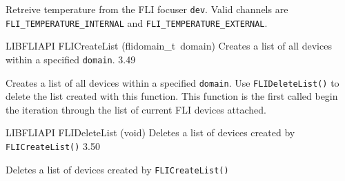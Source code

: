 \documentclass{article}
\begin{document}
\begin{cxxentry}
\begin{cxxfunction}
\begin{cxxdoc}
Retreive temperature from the FLI focuser \texttt{dev}. Valid channels are
\texttt{FLI\_TEMPERATURE\_INTERNAL} and \texttt{FLI\_TEMPERATURE\_EXTERNAL}.


\end{cxxdoc}
\end{cxxfunction}
\begin{cxxfunction}
{LIBFLIAPI}
        {FLICreateList}
        {(flidomain\_t\ domain)}
        { Creates a list of all devices within a specified \texttt{domain}.}
        {3.49}
\begin{cxxdoc}

Creates a list of all devices within a specified
\texttt{domain}. Use \texttt{FLIDeleteList()} to delete the list
created with this function. This function is the first called begin
the iteration through the list of current FLI devices attached.


\end{cxxdoc}
\end{cxxfunction}
\begin{cxxfunction}
{LIBFLIAPI}
        {FLIDeleteList}
        {(void)}
        { Deletes a list of devices created by \texttt{FLICreateList()}  }
        {3.50}
\begin{cxxdoc}

Deletes a list of devices created by \texttt{FLICreateList()}



\end{cxxdoc}
\end{cxxfunction}
\end{cxxentry}
\end{document}
